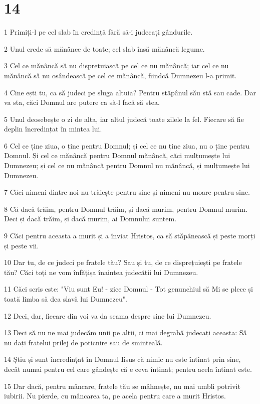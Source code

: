 \chapter{14}

\par 1 Primiți-l pe cel slab în credință fără să-i judecați gândurile.
\par 2 Unul crede să mănânce de toate; cel slab însă mănâncă legume.
\par 3 Cel ce mănâncă să nu disprețuiască pe cel ce nu mănâncă; iar cel ce nu mănâncă să nu osândească pe cel ce mănâncă, fiindcă Dumnezeu l-a primit.
\par 4 Cine ești tu, ca să judeci pe sluga altuia? Pentru stăpânul său stă sau cade. Dar va sta, căci Domnul are putere ca să-l facă să stea.
\par 5 Unul deosebește o zi de alta, iar altul judecă toate zilele la fel. Fiecare să fie deplin încredințat în mintea lui.
\par 6 Cel ce ține ziua, o ține pentru Domnul; și cel ce nu ține ziua, nu o ține pentru Domnul. Și cel ce mănâncă pentru Domnul mănâncă, căci mulțumește lui Dumnezeu; și cel ce nu mănâncă pentru Domnul nu mănâncă, și mulțumește lui Dumnezeu.
\par 7 Căci nimeni dintre noi nu trăiește pentru sine și nimeni nu moare pentru sine.
\par 8 Că dacă trăim, pentru Domnul trăim, și dacă murim, pentru Domnul murim. Deci și dacă trăim, și dacă murim, ai Domnului suntem.
\par 9 Căci pentru aceasta a murit și a înviat Hristos, ca să stăpânească și peste morți și peste vii.
\par 10 Dar tu, de ce judeci pe fratele tău? Sau și tu, de ce disprețuiești pe fratele tău? Căci toți ne vom înfățișa înaintea judecății lui Dumnezeu.
\par 11 Căci scris este: "Viu sunt Eu! - zice Domnul - Tot genunchiul să Mi se plece și toată limba să dea slavă lui Dumnezeu".
\par 12 Deci, dar, fiecare din voi va da seama despre sine lui Dumnezeu.
\par 13 Deci să nu ne mai judecăm unii pe alții, ci mai degrabă judecați aceasta: Să nu dați fratelui prilej de poticnire sau de sminteală.
\par 14 Știu și sunt încredințat în Domnul Iisus că nimic nu este întinat prin sine, decât numai pentru cel care gândește că e ceva întinat; pentru acela întinat este.
\par 15 Dar dacă, pentru mâncare, fratele tău se mâhnește, nu mai umbli potrivit iubirii. Nu pierde, cu mâncarea ta, pe acela pentru care a murit Hristos.
